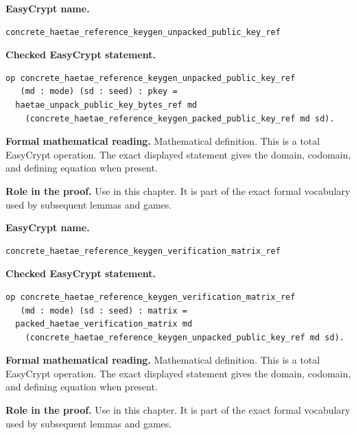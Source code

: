 \begin{formaldefinition}
\noindent\textbf{EasyCrypt name.}
\begin{lstlisting}[language=EasyCrypt,basicstyle=\ttfamily\scriptsize]
concrete_haetae_reference_keygen_unpacked_public_key_ref
\end{lstlisting}
\noindent\textbf{Checked EasyCrypt statement.}
\begin{lstlisting}[language=EasyCrypt,basicstyle=\ttfamily\scriptsize]
op concrete_haetae_reference_keygen_unpacked_public_key_ref
   (md : mode) (sd : seed) : pkey =
  haetae_unpack_public_key_bytes_ref md
    (concrete_haetae_reference_keygen_packed_public_key_ref md sd).
\end{lstlisting}
\noindent\textbf{Formal mathematical reading.}
Mathematical definition. This is a total EasyCrypt operation.  The exact displayed statement gives the domain, codomain, and defining equation when present.

\noindent\textbf{Role in the proof.}
Use in this chapter. It is part of the exact formal vocabulary used by subsequent lemmas and games.

\end{formaldefinition}

\begin{formaldefinition}
\noindent\textbf{EasyCrypt name.}
\begin{lstlisting}[language=EasyCrypt,basicstyle=\ttfamily\scriptsize]
concrete_haetae_reference_keygen_verification_matrix_ref
\end{lstlisting}
\noindent\textbf{Checked EasyCrypt statement.}
\begin{lstlisting}[language=EasyCrypt,basicstyle=\ttfamily\scriptsize]
op concrete_haetae_reference_keygen_verification_matrix_ref
   (md : mode) (sd : seed) : matrix =
  packed_haetae_verification_matrix md
    (concrete_haetae_reference_keygen_unpacked_public_key_ref md sd).
\end{lstlisting}
\noindent\textbf{Formal mathematical reading.}
Mathematical definition. This is a total EasyCrypt operation.  The exact displayed statement gives the domain, codomain, and defining equation when present.

\noindent\textbf{Role in the proof.}
Use in this chapter. It is part of the exact formal vocabulary used by subsequent lemmas and games.

\end{formaldefinition}

